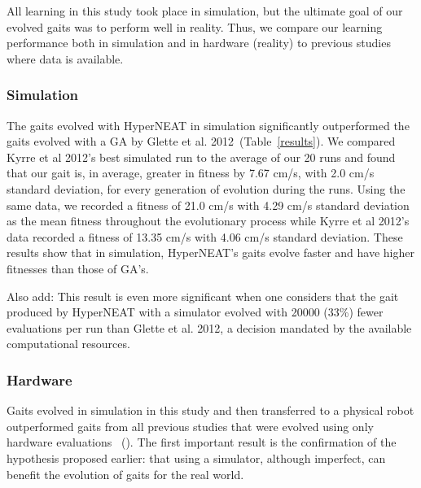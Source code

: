 
All learning in this study took place in simulation, but the ultimate
goal of our evolved gaits was to perform well in reality. Thus, we
compare our learning performance both in simulation and in hardware
(reality) to previous studies where data is available.

\subsubsection{Simulation}

The gaits evolved with HyperNEAT in simulation
significantly outperformed the gaits evolved with a GA by Glette et
al. 2012~(Table~\ref{results}). We compared Kyrre et al 2012's
best simulated run to the average of our 20 runs and found that our
gait is, in average, greater in fitness by 7.67 cm/s, with 2.0 cm/s
standard deviation, for every generation of evolution during the
runs. Using the same data, we recorded a fitness of 21.0 cm/s with
4.29 cm/s standard deviation as the mean fitness throughout the
evolutionary process while Kyrre et al 2012's data recorded a fitness
of 13.35 cm/s with 4.06 cm/s standard deviation. These results show
that in simulation, HyperNEAT's gaits evolve faster and have higher
fitnesses than those of GA's.

Also add: This result
is even more significant when one considers that the gait produced by
HyperNEAT with a simulator evolved with 20000 (33\%) fewer evaluations
per run than Glette et al. 2012, a decision mandated by the available
computational resources.

\subsubsection{Hardware}

Gaits evolved in simulation in this study and then transferred to a
physical robot outperformed gaits from all previous studies that were
evolved using only hardware evaluations~\cite{yos:clune,haocheng}
(). The first important result is the confirmation of
the hypothesis proposed earlier: that using a simulator, although
imperfect, can benefit the evolution of gaits for the real world.

